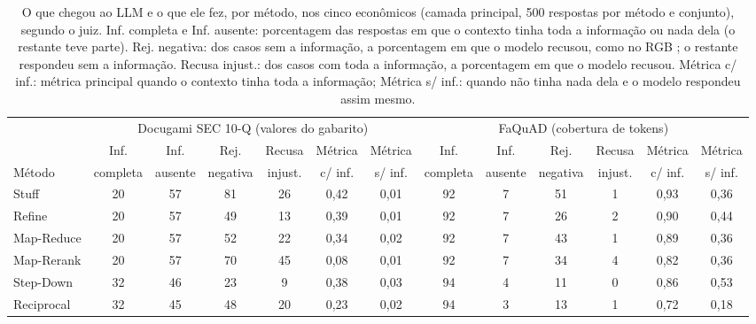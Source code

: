 \begin{table}[!t]
\centering
\footnotesize
\setlength{\tabcolsep}{3.5pt}
\caption{O que chegou ao LLM e o que ele fez, por método, nos cinco econômicos (camada principal, 500 respostas por método e conjunto), segundo o juiz. Inf. completa e Inf. ausente: porcentagem das respostas em que o contexto tinha toda a informação ou nada dela (o restante teve parte). Rej. negativa: dos casos sem a informação, a porcentagem em que o modelo recusou, como no RGB \cite{chen2024rgb}; o restante respondeu sem a informação. Recusa injust.: dos casos com toda a informação, a porcentagem em que o modelo recusou. Métrica c/ inf.: métrica principal quando o contexto tinha toda a informação; Métrica s/ inf.: quando não tinha nada dela e o modelo respondeu assim mesmo.}
\label{tab:contexto}
\begin{tabular}{lcccccccccccc}
\toprule
 & \multicolumn{6}{c}{Docugami SEC 10-Q (valores do gabarito)} & \multicolumn{6}{c}{FaQuAD (cobertura de tokens)} \\
\cmidrule(lr){2-7}\cmidrule(lr){8-13}
 & Inf. & Inf. & Rej. & Recusa & Métrica & Métrica & Inf. & Inf. & Rej. & Recusa & Métrica & Métrica \\
Método & completa & ausente & negativa & injust. & c/ inf. & s/ inf. & completa & ausente & negativa & injust. & c/ inf. & s/ inf. \\
\midrule
Stuff & 20 & 57 & 81 & 26 & 0,42 & 0,01 & 92 & 7 & 51 & 1 & 0,93 & 0,36 \\
Refine & 20 & 57 & 49 & 13 & 0,39 & 0,01 & 92 & 7 & 26 & 2 & 0,90 & 0,44 \\
Map-Reduce & 20 & 57 & 52 & 22 & 0,34 & 0,02 & 92 & 7 & 43 & 1 & 0,89 & 0,36 \\
Map-Rerank & 20 & 57 & 70 & 45 & 0,08 & 0,01 & 92 & 7 & 34 & 4 & 0,82 & 0,36 \\
Step-Down & 32 & 46 & 23 & 9 & 0,38 & 0,03 & 94 & 4 & 11 & 0 & 0,86 & 0,53 \\
Reciprocal & 32 & 45 & 48 & 20 & 0,23 & 0,02 & 94 & 3 & 13 & 1 & 0,72 & 0,18 \\
\bottomrule
\end{tabular}
\end{table}
